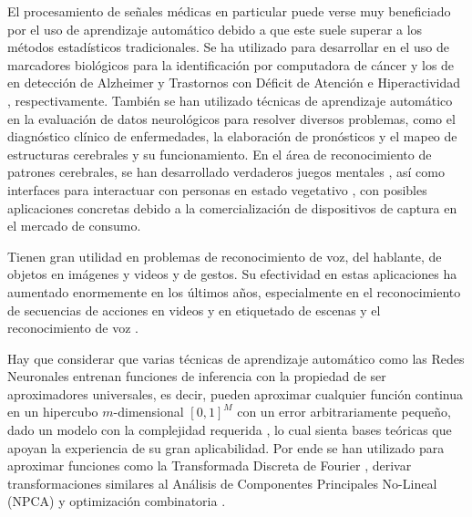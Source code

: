 El procesamiento de señales médicas en particular puede verse muy beneficiado por el uso de aprendizaje automático debido a que este suele superar a los métodos estadísticos tradicionales. Se ha utilizado para desarrollar en el uso de marcadores biológicos para la identificación por computadora de cáncer \cite{abeel2010}  y los de en detección de Alzheimer y Trastornos con Déficit de Atención e Hiperactividad \cite{lehmann2007,sidhu2012}, respectivamente. También se han utilizado técnicas de aprendizaje automático en la evaluación de datos neurológicos para resolver diversos problemas, como el diagnóstico clínico de enfermedades, la elaboración de pronósticos y el mapeo de estructuras cerebrales y su funcionamiento. En el área de reconocimiento de patrones cerebrales, se han desarrollado verdaderos juegos mentales \cite{finke2009}, así como interfaces para interactuar con personas en estado vegetativo \cite{lule2012}, con posibles aplicaciones concretas debido a la comercialización de dispositivos de captura en el mercado de consumo.

Tienen gran utilidad en problemas de reconocimiento de voz, del hablante, de objetos en imágenes y videos y de gestos. Su efectividad en estas aplicaciones ha aumentado enormemente en los últimos años, especialmente en el reconocimiento de secuencias de acciones en videos y en etiquetado de escenas \cite{le2011,le2012,farabet2013} y el reconocimiento de voz \cite{hinton2012,deng2013}.

Hay que considerar que varias técnicas de aprendizaje automático como las Redes Neuronales entrenan funciones de inferencia con la propiedad de ser aproximadores universales, es decir, pueden aproximar cualquier función continua en un hipercubo $m$-dimensional $ [0,1]^M $ con un error arbitrariamente pequeño, dado un modelo con la complejidad requerida \cite{haykin1994}, lo cual sienta bases teóricas que apoyan la experiencia de su gran aplicabilidad. Por ende se han utilizado para aproximar funciones como la Transformada Discreta de Fourier \cite{velik2008}, derivar transformaciones similares al Análisis de Componentes Principales No-Lineal (NPCA) \cite{kramer1991} y optimización combinatoria \cite{smith1999}.